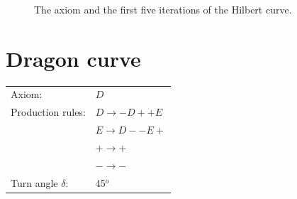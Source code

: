 \documentclass[11pt]{article}
\begin{document}
\begin{figure}[H]
  \hfill
  \hfill

  \caption{The axiom and the first five iterations of the Hilbert curve.}
\end{figure}





\section{Dragon curve}

\begin{tabular}{ll}
Axiom: & $D$ \\
Production rules: & $D \to - D + + E$ \\
& $E \to D - - E +$ \\
& $+ \to +$ \\
& $- \to -$ \\
Turn angle $\delta$: & 45$^o$ \\
\end{tabular}
\end{document}
